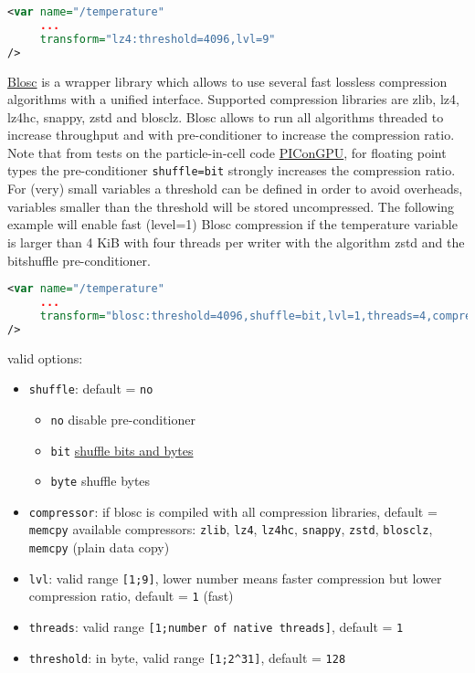\begin{lstlisting}[language=XML]
<var name="/temperature"
     ...
     transform="lz4:threshold=4096,lvl=9"
/>
\end{lstlisting}


\href{https://github.com/Blosc/c-blosc}{Blosc} is a wrapper library which allows to use several fast lossless compression algorithms with a unified interface.
Supported compression libraries are zlib, lz4, lz4hc, snappy, zstd and blosclz.
Blosc allows to run all algorithms threaded to increase throughput and with pre-conditioner to increase the compression ratio.
Note that from tests on the particle-in-cell code \href{http://picongpu.hzdr.de}{PIConGPU}, for floating point types the pre-conditioner \verb+shuffle=bit+ strongly increases the compression ratio.
For (very) small variables a threshold can be defined in order to avoid overheads, variables smaller than the threshold will be stored uncompressed.
The following example will enable fast (level=1) Blosc compression if the temperature variable is larger than 4 KiB with four threads per writer with the algorithm zstd and the bitshuffle pre-conditioner.

\begin{lstlisting}[language=XML]
<var name="/temperature"
     ...
     transform="blosc:threshold=4096,shuffle=bit,lvl=1,threads=4,compressor=zstd"
/>
\end{lstlisting}


valid options:
\begin{itemize}
  \item \verb+shuffle+: default = \verb+no+
  \begin{itemize}
    \item \verb+no+ disable pre-conditioner
    \item \verb+bit+ \href{http://blosc.org/blog/new-bitshuffle-filter.html}{shuffle bits and bytes}
    \item \verb+byte+ shuffle bytes
  \end{itemize}
  \item \verb+compressor+: if blosc is compiled with all compression libraries, default = \verb+memcpy+\newline
        available compressors: \verb+zlib+, \verb+lz4+, \verb+lz4hc+, \verb+snappy+, \verb+zstd+, \verb+blosclz+, \verb+memcpy+ (plain data copy)
  \item \verb+lvl+: valid range \verb+[1;9]+, lower number means faster compression but lower compression ratio, default = \verb+1+ (fast)
  \item \verb+threads+: valid range \verb+[1;number of native threads]+, default = \verb+1+
  \item \verb+threshold+: in byte, valid range \verb+[1;2^31]+, default = \verb+128+
\end{itemize}


